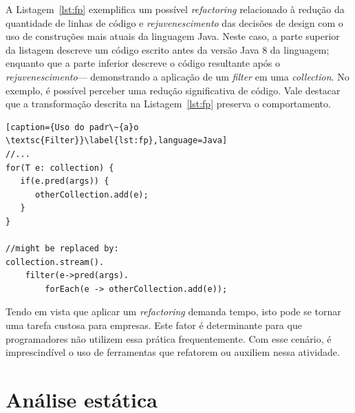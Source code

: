 
A Listagem~\ref{lst:fp} exemplifica um poss\'{i}vel \emph{refactoring} relacionado \`{a} 
redu\c c\~{a}o da quantidade de linhas de c\'{o}digo e \emph{rejuvenescimento} 
das decis\~{o}es de design com o uso de constru\c c\~{o}es mais atuais da 
linguagem Java. Neste caso, a parte superior da listagem descreve um c\'{o}digo 
escrito antes da vers\~{a}o Java 8 da linguagem; enquanto que a parte inferior descreve o 
c\'{o}digo resultante ap\'{o}s o \emph{rejuvenescimento}--- demonstrando a   
aplica\c c\~{a}o de um {\it filter} em uma {\it collection}. No exemplo, \'{e}  
poss\'{i}vel perceber uma redu\c{c}\~{a}o significativa de c\'{o}digo. 
Vale destacar que a transforma\c c\~{a}o descrita
na Listagem~\ref{lst:fp} preserva o comportamento.


\begin{lstlisting}[caption={Uso do padr\~{a}o \textsc{Filter}}\label{lst:fp},language=Java] 
//...
for(T e: collection) {
   if(e.pred(args)) {
      otherCollection.add(e);
   }
}

//might be replaced by:
collection.stream().
	filter(e->pred(args).
		forEach(e -> otherCollection.add(e));
\end{lstlisting}




Tendo em vista que aplicar um \textit{refactoring} demanda tempo, 
isto pode se tornar uma tarefa custosa para empresas. Este fator \'{e} determinante 
para que programadores n\~{a}o utilizem essa pr\'{a}tica frequentemente. Com esse 
cen\'{a}rio, \'{e} imprescindível o uso de ferramentas que refatorem ou auxiliem 
nessa atividade. 


\section{Análise estática}\label{sec:as}

